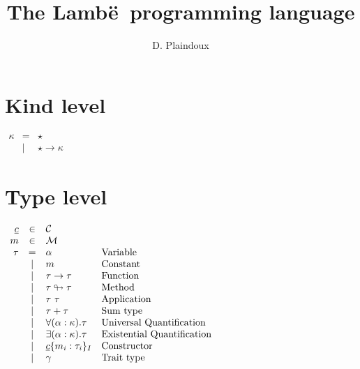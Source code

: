\documentclass{article}[11pt]
\newcommand{\lambe}[0]{{\sf Lamb\"e~}}
\begin{document}
    \title{The \lambe programming language}
    \author{D. Plaindoux}

    \maketitle

    \section{Kind level}\label{sec:kind-level}

    \begin{math}
        \begin{array}{rcll}
            \kappa
            & =    & \star                    \\
            & \mid & \star \rightarrow \kappa
        \end{array}
    \end{math}


    \section{Type level}\label{sec:type-level}

    \begin{math}
        \begin{array}{rclp{5cm}}
            \underline{c} & \in & {\cal C} \\
            m & \in & {\cal M} \\
            \tau & =
            & \alpha & Variable \\
            & \mid & m                               & Constant                   \\
            & \mid & \tau \rightarrow \tau           & Function                   \\
            & \mid & \tau \looparrowright \tau       & Method                     \\
            & \mid & \tau~\tau                       & Application                \\
            & \mid & \tau + \tau                     & Sum~type                   \\
            & \mid & \forall (\alpha:\kappa).\tau    & Universal~Quantification   \\
            & \mid & \exists (\alpha:\kappa).\tau    & Existential~Quantification \\
            & \mid & \underline{c}\{ m_i:\tau_i \}_I & Constructor                \\
            & \mid & \gamma                          & Trait~type                 \\
        \end{array}
    \end{math}
\end{document}

